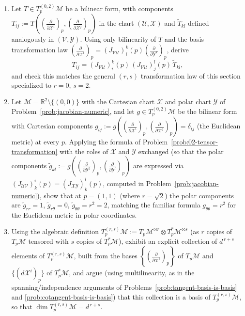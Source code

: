 \documentclass[11pt]{article}
\newcommand{\TpM}{T_p\mathcal M}
\newcommand{\TpsM}{T_p^*\mathcal M}
\newcommand{\TprsM}{T_p^{(r,s)}\mathcal M}
\begin{document}
\begin{enumerate}[label=\textbf{4.\arabic*}, leftmargin=2.2cm, start=17]

\item \label{prob:02-tensor-transformation}
Let $T\in T_p^{(0,2)}\mathcal M$ be a bilinear form, with components
$T_{ij}:=T\!\left(\left(\frac{\partial}{\partial\mathcal
X^i}\right)_p,\left(\frac{\partial}{\partial\mathcal X^j}\right)_p\right)$
in the chart $(\mathcal U,\mathcal X)$ and $\widetilde T_{kl}$ defined
analogously in $(\mathcal V,\mathcal Y)$. Using only bilinearity of $T$ and
the basis transformation law $\left(\frac{\partial}{\partial\mathcal
X^i}\right)_p=(J_{\mathcal{VU}})^k_i(p)\left(\frac{\partial}{\partial
\mathcal Y^k}\right)_p$, derive
\[
T_{ij} = (J_{\mathcal{VU}})^k_i(p)\,(J_{\mathcal{VU}})^l_j(p)\,\widetilde T_{kl},
\]
and check this matches the general $(r,s)$ transformation law of this
section specialized to $r=0$, $s=2$.

\item \label{prob:euclidean-metric-polar}
Let $\mathcal M=\mathbb R^2\setminus\{(0,0)\}$ with the Cartesian chart
$\mathcal X$ and polar chart $\mathcal Y$ of
Problem~\ref{prob:jacobian-numeric}, and let $g\in T_p^{(0,2)}\mathcal M$
be the bilinear form with Cartesian components $g_{ij}:=g\!\left(\left(
\frac{\partial}{\partial\mathcal X^i}\right)_p,\left(\frac{\partial}
{\partial\mathcal X^j}\right)_p\right)=\delta_{ij}$ (the Euclidean metric)
at every $p$. Applying the formula of
Problem~\ref{prob:02-tensor-transformation} with the roles of $\mathcal X$
and $\mathcal Y$ exchanged (so that the polar components $\widetilde
g_{kl}:=g\!\left(\left(\frac{\partial}{\partial\mathcal
Y^k}\right)_p,\left(\frac{\partial}{\partial\mathcal Y^l}\right)_p\right)$
are expressed via $(J_{\mathcal{UV}})^i_k(p)=(J_{\mathcal{XY}})^i_k(p)$,
computed in Problem~\ref{prob:jacobian-numeric}), show that at $p=(1,1)$
(where $r=\sqrt2$) the polar components are $\widetilde g_{rr}=1$,
$\widetilde g_{r\theta}=0$, $\widetilde g_{\theta\theta}=r^2=2$, matching
the familiar formula $g_{\theta\theta}=r^2$ for the Euclidean metric in
polar coordinates.

\item \label{prob:tensor-basis-dimension}
Using the algebraic definition $\TprsM:=\TpM^{\otimes r}\otimes\TpsM^{\otimes s}$
(as $r$ copies of $\TpM$ tensored with $s$ copies of $\TpsM$), exhibit an
explicit collection of $d^{\,r+s}$ elements of $\TprsM$, built from the
bases $\left\{\left(\frac{\partial}{\partial\mathcal X^i}\right)_p\right\}$
of $\TpM$ and $\{(d\mathcal X^i)_p\}$ of $\TpsM$, and argue (using
multilinearity, as in the spanning/independence arguments of
Problems~\ref{prob:tangent-basis-is-basis} and
\ref{prob:cotangent-basis-is-basis}) that this collection is a basis of
$\TprsM$, so that $\dim\TprsM=d^{\,r+s}$.

\end{enumerate}
\end{document}
